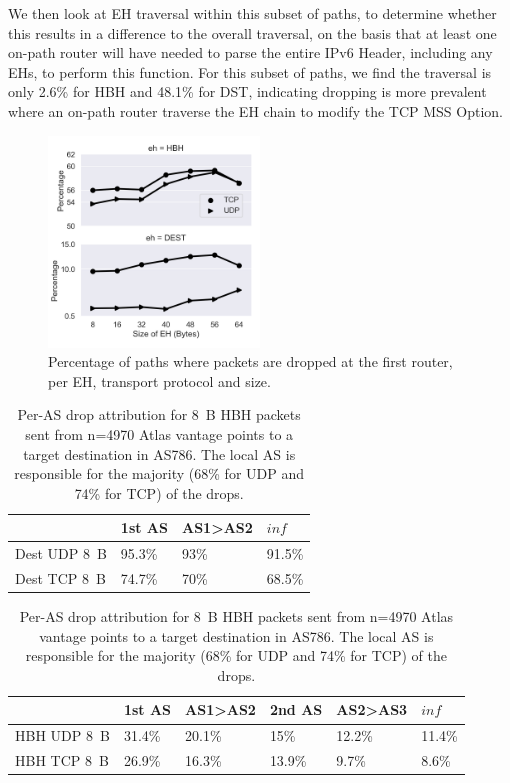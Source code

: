 \documentclass[conference]{IEEEtran}
\begin{document}
We then look at EH traversal within this subset of paths, to determine whether this results in a difference to the overall traversal, on the basis that at least one on-path router will have needed to parse the entire IPv6 Header, including any EHs, to perform this function.
For this subset of paths, we find the traversal is only 2.6\% for HBH and 48.1\% for DST, indicating dropping is more prevalent where an on-path router traverse the EH chain to modify the TCP MSS Option.


\begin{figure}
\centering
  \includegraphics[width=0.5\textwidth]{empty_paths.png}
  \caption{Percentage of paths where packets are dropped at the first router, per EH, transport protocol and size.}
  \label{fig:empty_paths}
\end{figure}


\begin{table}
\centering
\caption{Per-AS drop attribution for 8~B DST packets sent from n=4970 Atlas vantage points to a target destination in AS786. The local AS is responsible for the majority (5\% for UDP and 25\% for TCP) of the drops.}
 \label{tbl:uk_as1}

\begin{tabular}{l|l|l|l}
                                   & 1st AS & AS1\textgreater AS2 & $inf $     \\ \hline 

{Dest UDP 8~B} & 95.3\% & 93\%                 & 91.5\% \\ \hline

{Dest TCP 8~B} & 74.7\% & 70\%                 & 68.5\%
\end{tabular}
\bigskip
\caption{Per-AS drop attribution for 8~B HBH packets sent from n=4970 Atlas vantage points to a target destination in AS786. The local AS is responsible for the majority (68\% for UDP and 74\% for TCP) of the drops.}
\begin{tabular}{p{}|l|l|l|l|l}

              & 1st AS & AS1\textgreater{}AS2 & 2nd AS & AS2\textgreater{}AS3 & $inf$     \\ \hline
HBH UDP 8~B & 31.4\% & 20.1\%               & 15\%   & 12.2\%               & 11.4\% \\ \hline
HBH TCP 8~B & 26.9\% & 16.3\%               & 13.9\% & 9.7\%                & 8.6\%  \\ 
\end{tabular}
 \label{tbl:uk_as2}
\end{table}
\end{document}
